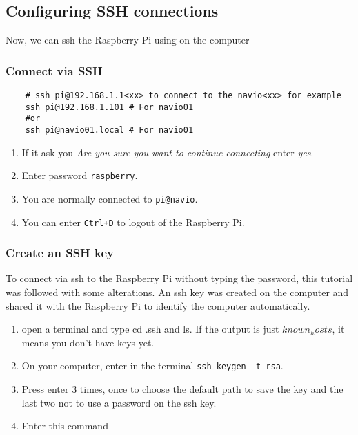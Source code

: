 \subsection{Configuring SSH connections}
Now, we can ssh the Raspberry Pi using on the computer
\subsubsection{Connect via SSH}

\begin{verbatim}
    # ssh pi@192.168.1.1<xx> to connect to the navio<xx> for example
    ssh pi@192.168.1.101 # For navio01
    #or
    ssh pi@navio01.local # For navio01

                \end{verbatim}

\begin{enumerate}
    \item If it ask you \emph{Are you sure you want to continue connecting} enter \emph{yes}.
    \item Enter password \texttt{raspberry}.
    \item You are normally connected to \texttt{pi@navio}.
    \item You can enter \texttt{Ctrl+D} to logout of the Raspberry Pi.
\end{enumerate}

\subsubsection{Create an SSH key}
To connect via ssh to the Raspberry Pi without typing the password, this tutorial \cite{ssh_ssh_copy_id} was followed with some alterations. An ssh key was created on the computer and shared it with the Raspberry Pi to identify the computer automatically.

\begin{enumerate}
    \item open a terminal and type cd .ssh and ls. If the output is just $known_hosts$, it means you don't have keys yet.
    \item On your computer, enter in the terminal \texttt{ssh-keygen -t rsa}.
    \item Press enter 3 times, once to choose the default path to save the key and the last two not to use a password on the ssh key.
    \item Enter this command
\end{enumerate}

